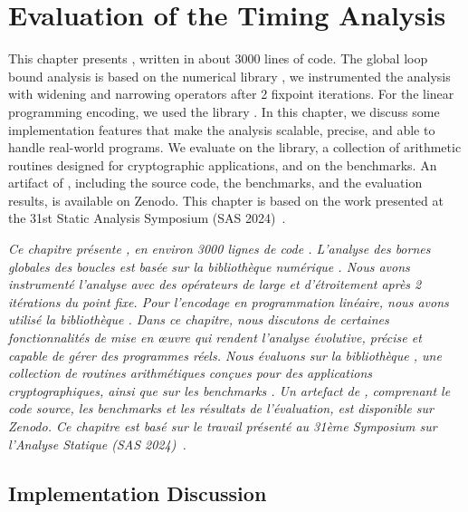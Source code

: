 \setchapterpreamble[u]{\margintoc}

\chapter{Evaluation of the Timing Analysis}

\marginemptybox{2.2cm}

This chapter presents \timesec\sidenote{\timesecurl}, written in about 3000 lines of \python{} code.
The global loop bound analysis is based on the numerical library \apron{} , we instrumented the analysis with widening and narrowing operators after 2 fixpoint iterations.
For the linear programming encoding, we used the \python{} library \scipy{}.
In this chapter, we discuss some implementation features that make the analysis scalable, precise, and able to handle real-world programs.
We evaluate \timesec{} on the \bignum{} library\sidenote{\bignumurl}, a collection of arithmetic routines designed for cryptographic applications, and on the \svcomp{} benchmarks\sidenote{\svcompurl}.
An artifact of \timesec, including the source code, the benchmarks, and the evaluation results, is available on Zenodo\sidenote{\timeseczenodo}.
This chapter is based on the work presented at the 31st Static Analysis Symposium (SAS 2024)~.


\frenchdiv

\emph{Ce chapitre présente \timesec, en environ 3000 lignes de code \python{}. L'analyse des bornes globales des boucles est basée sur la bibliothèque numérique \apron{} \cite{Jeannet2009}. Nous avons instrumenté l'analyse avec des opérateurs de large et d'étroitement après 2 itérations du point fixe. Pour l'encodage en programmation linéaire, nous avons utilisé la bibliothèque \python{} \scipy. Dans ce chapitre, nous discutons de certaines fonctionnalités de mise en œuvre qui rendent l'analyse évolutive, précise et capable de gérer des programmes réels. Nous évaluons \timesec{} sur la bibliothèque \bignum{}, une collection de routines arithmétiques conçues pour des applications cryptographiques, ainsi que sur les benchmarks \svcomp{}. Un artefact de \timesec, comprenant le code source, les benchmarks et les résultats de l'évaluation, est disponible sur Zenodo. Ce chapitre est basé sur le travail présenté au 31ème Symposium sur l'Analyse Statique (SAS 2024)~\cite{Mazzucato2024c}.}

\section{Implementation Discussion}

